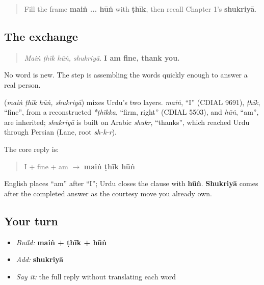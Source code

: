 \label{lesson:UR-C04-main-thik-hun}



\begin{quote}
Fill the frame \textbf{maiṅ ... hūṅ} with \textbf{ṭhīk}, then recall Chapter 1's \textbf{shukriyā}.
\end{quote}

\subsection*{The exchange}
\begin{quote}
\textbf{   } \emph{Maiṅ ṭhīk hūṅ, shukriyā.} \textbf{I am fine, thank you.}
\end{quote}

No word is new. The step is assembling the words quickly enough to answer a real person.

\begin{cousinweb}
\textbf{   } (\emph{maiṅ ṭhīk hūṅ, shukriyā}) mixes Urdu's two layers. \emph{maiṅ}, \textquotedblleft{}I\textquotedblright{} (CDIAL 9691), \emph{ṭhīk}, \textquotedblleft{}fine\textquotedblright{}, from a reconstructed \emph{*ṭhīkka}, \textquotedblleft{}firm, right\textquotedblright{} (CDIAL 5503), and \emph{hūṅ}, \textquotedblleft{}am\textquotedblright{}, are inherited; \emph{shukriyā} is built on Arabic \emph{shukr}, \textquotedblleft{}thanks\textquotedblright{}, which reached Urdu through Persian (Lane, root \emph{sh-k-r}).
\end{cousinweb}

\begin{grammarlens}[title={Grammar Lens: keep the copula final}]
The core reply is:

\begin{quote}
I + fine + am $\to$ \textbf{maiṅ ṭhīk hūṅ}
\end{quote}

English places “am” after “I”; Urdu closes the clause with \textbf{hūṅ}. \textbf{Shukriyā} comes after the completed answer as the courtesy move you already own.
\end{grammarlens}

\subsection*{Your turn}
\begin{itemize}
\raggedright
  \item \emph{Build:} \textbf{maiṅ + ṭhīk + hūṅ}
  \item \emph{Add:} \textbf{shukriyā}
  \item \emph{Say it:} the full reply without translating each word
\end{itemize}

